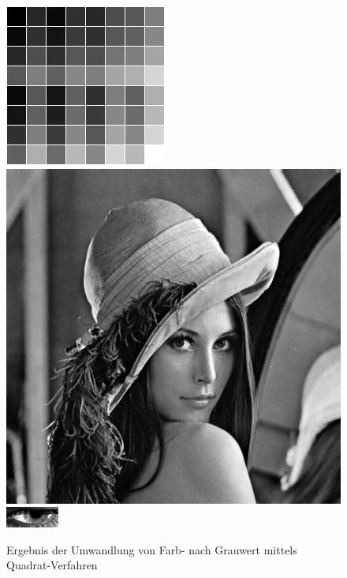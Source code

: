 \begin{figure}
	\centering
	\includegraphics[width=0.21\linewidth]{img/Farbkarte3}
	\includegraphics[width=0.21\linewidth]{img/Lena3}
	\includegraphics[width=0.21\linewidth]{img/Auge_3Gray}
	\caption{Ergebnis der Umwandlung von Farb- nach Grauwert mittels Quadrat-Verfahren}
	\label{img_Quadrat}
\end{figure}